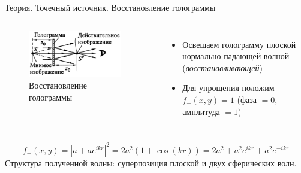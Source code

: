 \documentclass[11pt]{beamer} %
\begin{document}
    \begin{frame}{Теория. Точечный источник. Восстановление голограммы}
        \begin{columns}
            \begin{figure}[H]
                \centering
                \includegraphics[width = 0.9\textwidth]{images/recovery.jpg}
                \caption{Восстановление голограммы}
            \end{figure}
        
            \begin{itemize}
               \item Освещаем голограмму плоской нормально падающей волной (\textit{восстанавливающей})
               \item Для упрощения положим $f_{-}(x,y) = 1$ (фаза $= 0$, амплитуда $= 1$)   
           \end{itemize}
        \end{columns}
       \begin{equation}
           f_+ (x, y) = \left| a+ a e^{i k r}\right|^2 = 2 a^2 (1+\cos (k r)) = 2 a^2 + a^2 e^{i k r} +a^2 e^{- i k r}
       \end{equation}
       Структура полученной волны: суперпозиция плоской и двух сферических волн.
   \end{frame}
\end{document}
